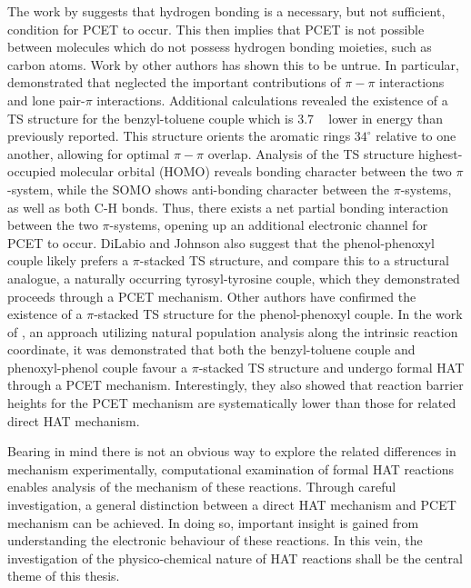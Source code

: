 The work by \citet{Mayer2002} suggests that hydrogen bonding is a necessary, but not sufficient, condition for PCET to occur. This then implies that PCET is not possible between molecules which do not possess hydrogen bonding moieties, such as carbon atoms. Work by other authors has shown this to be untrue.\cite{Hatcher2007, DiLabio2007} In particular, \citet{DiLabio2007} demonstrated that \citet{Mayer2002} neglected the important contributions of $\pi-\pi$ interactions and lone pair-$\pi$ interactions. Additional calculations revealed the existence of a TS structure for the benzyl-toluene couple which is 3.7 \kcalmol~ lower in energy than previously reported. This structure orients the aromatic rings $34^\circ$ relative to one another, allowing for optimal $\pi-\pi$ overlap.
Analysis of the TS structure highest-occupied molecular orbital (HOMO) reveals bonding character between the two $\pi$-system, while the SOMO shows anti-bonding character between the $\pi$-systems, as well as both C-H bonds. Thus, there exists a net partial bonding interaction between the two $\pi$-systems, opening up an additional electronic channel for PCET to occur. DiLabio and Johnson also suggest that the phenol-phenoxyl couple likely prefers a $\pi$-stacked TS structure, and compare this to a structural analogue, a naturally occurring tyrosyl-tyrosine couple, which they demonstrated proceeds through a PCET mechanism. Other authors have confirmed the existence of a $\pi$-stacked TS structure for the phenol-phenoxyl couple.\cite{Sirjoosingh2011, HammesSchiffer2015, MunozRugeles2017} In the work of \citet{MunozRugeles2017}, an approach utilizing natural population analysis along the intrinsic reaction coordinate, it was demonstrated that both the benzyl-toluene couple and phenoxyl-phenol couple favour a $\pi$-stacked TS structure and undergo formal HAT through a PCET mechanism. Interestingly, they also showed that reaction barrier heights for the PCET mechanism are systematically lower than those for related direct HAT mechanism.

Bearing in mind there is not an obvious way to explore the related differences in mechanism experimentally, computational examination of formal HAT reactions enables analysis of the mechanism of these reactions. Through careful investigation, a general distinction between a direct HAT mechanism and PCET mechanism can be achieved. In doing so, important insight is gained from understanding the electronic behaviour of these reactions. In this vein, the investigation of the physico-chemical nature of HAT reactions shall be the central theme of this thesis.

